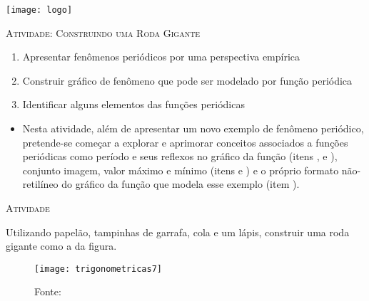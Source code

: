 \documentclass[10 pt,usenames,dvipsnames, oneside]{article}
\begin{document}
\begin{center}
  \begin{minipage}[l]{3cm}
\texttt{[image: logo]}    
\end{minipage}\hfill
\begin{minipage}[r]{.8\textwidth}
 {\Large \scshape Atividade: Construindo uma Roda Gigante}  
\end{minipage}
\end{center}
\vspace{.2cm}

\ifdefined\prof

\begin{goals}
\begin{enumerate}
\item Apresentar fenômenos periódicos por uma perspectiva
empírica
\item Construir gráfico de fenômeno que pode ser modelado por
função periódica
\item Identificar alguns elementos das funções periódicas
\end{enumerate}

\tcblower

\begin{itemize}
\item Nesta atividade, além de apresentar um novo exemplo de
fenômeno periódico, pretende-se começar a explorar e
aprimorar conceitos associados a funções periódicas como
período e seus reflexos no gráfico da função (itens ,  e ), conjunto imagem, valor máximo e mínimo (itens  e
) e o próprio formato não-retilíneo do gráfico da função
que modela esse exemplo (item ).
\end{itemize}
\end{goals}

\bigskip
\begin{center}
{\large \scshape Atividade}
\end{center}
\fi

Utilizando papelão, tampinhas de garrafa, cola e um lápis, construir uma roda gigante como a da figura.

\begin{figure}[H]
\centering

\texttt{[image: trigonometricas7]}
\caption{Fonte: \cite{soares2010}}
\label{}
\end{figure}
\end{document}
